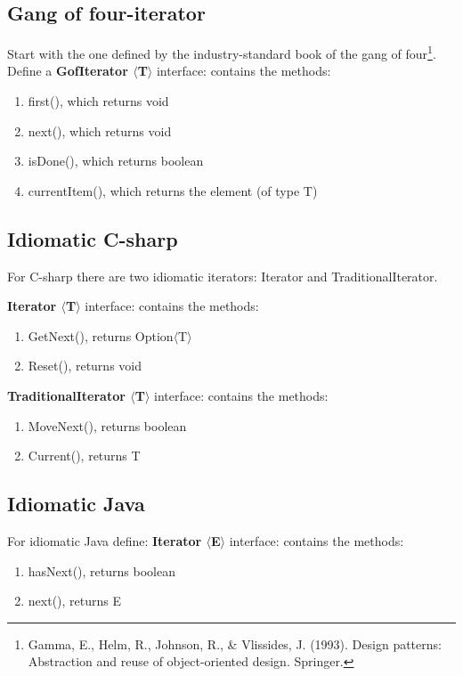 \subsection{Gang of four-iterator}
    Start with the one defined by the industry-standard book of the gang of four\footnote{Gamma, E., Helm, R., Johnson, R., \& Vlissides, J. (1993). Design patterns: Abstraction and reuse of object-oriented design. Springer.}.
    Define a \textbf{GofIterator $\langle$T$\rangle$} interface: contains the methods:
    \begin{enumerate}
        \item first(), which returns void
        \item next(),  which returns void
        \item isDone(), which returns boolean
        \item currentItem(), which returns the element (of type T)
    \end{enumerate}

\subsection{Idiomatic C-sharp}
    For C-sharp there are two idiomatic iterators: Iterator and TraditionalIterator.

    \textbf{Iterator $\langle$T$\rangle$} interface: contains the methods:
    \begin{enumerate}
        \item GetNext(), returns Option$\langle$T$\rangle$
        \item Reset(), returns void
    \end{enumerate}


    \textbf{TraditionalIterator $\langle$T$\rangle$} interface: contains the methods:
    \begin{enumerate}
        \item MoveNext(), returns boolean
        \item Current(), returns T
    \end{enumerate}


\subsection{Idiomatic Java}
    For idiomatic Java define:
    \textbf{Iterator $\langle$E$\rangle$} interface: contains the methods:
    \begin{enumerate}
        \item hasNext(), returns boolean
        \item next(), returns E
    \end{enumerate}



